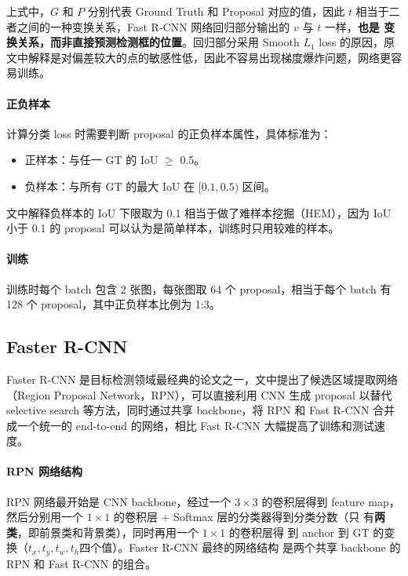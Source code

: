 上式中，$G$ 和 $P$ 分别代表 Ground Truth 和 Proposal 对应的值，因此 $t$ 相当于二
者之间的一种变换关系，Fast R-CNN 网络回归部分输出的 $v$ 与 $t$ 一样，\textbf{也是
  变换关系，而非直接预测检测框的位置}。回归部分采用 Smooth $L_1$ loss 的原因，原
文中解释是对偏差较大的点的敏感性低，因此不容易出现梯度爆炸问题，网络更容易训练。

\paragraph{正负样本}
计算分类 loss 时需要判断 proposal 的正负样本属性，具体标准为：

\begin{itemize}
  \item 正样本：与任一 GT 的 IoU $ \geq $ 0.5。
  \item 负样本：与所有 GT 的最大 IoU 在 $ [0.1, 0.5) $ 区间。
\end{itemize}

文中解释负样本的 IoU 下限取为 0.1 相当于做了难样本挖掘（HEM），因为 IoU 小于 0.1
的 proposal 可以认为是简单样本，训练时只用较难的样本。

\paragraph{训练}
训练时每个 batch 包含 2 张图，每张图取 64 个 proposal，相当于每个 batch 有 128
个 proposal，其中正负样本比例为 1:3。

\subsection{Faster R-CNN}
\label{subsec:Faster-R-CNN}

Faster R-CNN 是目标检测领域最经典的论文之一，文中提出了候选区域提取网络（Region
Proposal Network，RPN），可以直接利用 CNN 生成 proposal 以替代 selective search
等方法，同时通过共享 backbone，将 RPN 和 Fast R-CNN 合并成一个统一的 end-to-end
的网络，相比 Fast R-CNN 大幅提高了训练和测试速度。

\paragraph{RPN 网络结构}
RPN 网络最开始是 CNN backbone，经过一个 $3 \times 3$ 的卷积层得到 feature
map，然后分别用一个 $1 \times 1$ 的卷积层 + Softmax 层的分类器得到分类分数（只
有\textbf{两类}，即前景类和背景类），同时再用一个 $1 \times 1$ 的卷积层得
到 anchor 到 GT 的变换（$t_x, t_y, t_w, t_h$四个值）。Faster R-CNN 最终的网络结构
是两个共享 backbone 的 RPN 和 Fast R-CNN 的组合。

